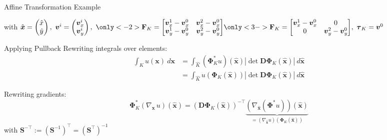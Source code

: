 \documentclass[xcolor=pdftex,table,10pt,yellow,mathserif]{beamer}
\begin{document}
\begin{frame}[t]{Affine Transformation Example}
\begin{figure}
    \end{figure}

    \vspace*{0.5cm}

    with $\hat{\boldsymbol{x}} = \begin{pmatrix}
        \hat{x}\\
        \hat{y}
    \end{pmatrix}, \ 
    \boldsymbol{v}^i = \begin{pmatrix}
        \boldsymbol{v}^i_x\\
        \boldsymbol{v}^i_y
    \end{pmatrix}, \
        \only<-2>{
        \mathbf{F}_K = \begin{bmatrix}
            \boldsymbol{v}^1_x - \boldsymbol{v}^0_x & \boldsymbol{v}^2_x - \boldsymbol{v}^0_x \\
            \boldsymbol{v}^1_y - \boldsymbol{v}^0_y & \boldsymbol{v}^2_y - \boldsymbol{v}^0_y
        \end{bmatrix}}
        \only<3->{
            \mathbf{F}_K = \begin{bmatrix}
                \boldsymbol{v}^1_x - \boldsymbol{v}^0_x & 0 \\
                0 & \boldsymbol{v}^2_y - \boldsymbol{v}^0_y
        \end{bmatrix}}, \ \boldsymbol{\tau}_K = \boldsymbol{v}^0
    $


\end{frame}

\begin{frame}{Applying Pullback}
    Rewriting integrals over elements:
    \begin{align*}
        \int_K u(\boldsymbol{x}) \ d\boldsymbol{x}
        &= \int_{\hat{K}} (\mathbf{\Phi}_K^* u)(\hat{\boldsymbol{x}}) | \det \mathbf{D \Phi}_K(\hat{\boldsymbol{x}}) | \ d\hat{\boldsymbol{x}}\\
        &= \int_{\hat{K}} u(\mathbf{\Phi}_K(\hat{\boldsymbol{x}})) | \det \mathbf{D \Phi}_K(\hat{\boldsymbol{x}}) | \ d\hat{\boldsymbol{x}}
    \end{align*}

    Rewriting gradients:
    \[
        \mathbf{\Phi}_K^*(\nabla_{\boldsymbol{x}} \, u)(\hat{\boldsymbol{x}}) 
        = (\mathbf{D \Phi}_K(\hat{\boldsymbol{x}}))^{-\top} 
        \underbrace{(\nabla_{\hat{\boldsymbol{x}}}(\mathbf{\Phi^*}u))(\hat{\boldsymbol{x}})}_{
            = (\nabla_{\hat{\boldsymbol{x}}} u)(\mathbf{\Phi}_K(\hat{\boldsymbol{x}}))
        }
    \]
    with $\mathbf{S}^{-\top} := (\mathbf{S}^{-1})^\top = (\mathbf{S}^\top)^{-1}$
\end{frame}
\end{document}
